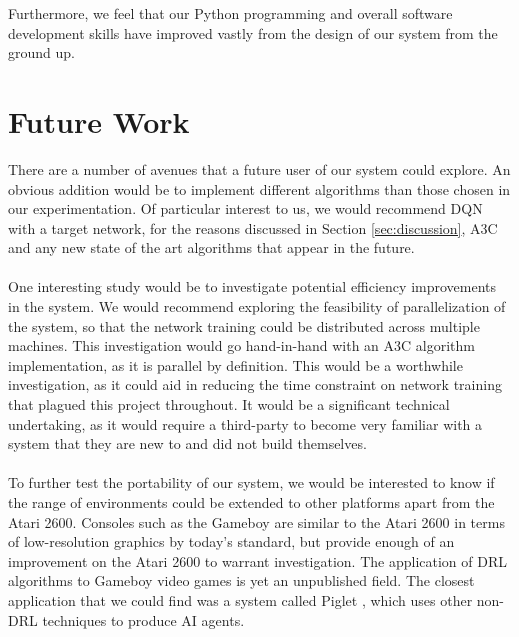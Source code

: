 Furthermore, we feel that our Python programming and overall software development skills have improved vastly from the design of our system from the ground up.

\section{Future Work}
There are a number of avenues that a future user of our system could explore. An obvious addition would be to implement different algorithms than those chosen in our experimentation. Of particular interest to us, we would recommend DQN with a target network, for the reasons discussed in Section \ref{sec:discussion}, A3C and any new state of the art algorithms that appear in the future. \paragraph{}

One interesting study would be to investigate potential efficiency improvements in the system. We would recommend exploring the feasibility of parallelization of the system, so that the network training could be distributed across multiple machines. This investigation would go hand-in-hand with an A3C algorithm implementation, as it is parallel by definition. This would be a worthwhile investigation, as it could aid in reducing the time constraint on network training that plagued this project throughout. It would be a significant technical undertaking, as it would require a third-party to become very familiar with a system that they are new to and did not build themselves. \paragraph{}

To further test the portability of our system, we would be interested to know if the range of environments could be extended to other platforms apart from the Atari 2600. Consoles such as the Gameboy \cite{gameboy} are similar to the Atari 2600 in terms of low-resolution graphics by today's standard, but provide enough of an improvement on the Atari 2600 to warrant investigation. The application of DRL algorithms to Gameboy video games is yet an unpublished field. The closest application that we could find was a system called Piglet \cite{piglet}, which uses other non-DRL techniques to produce AI agents.